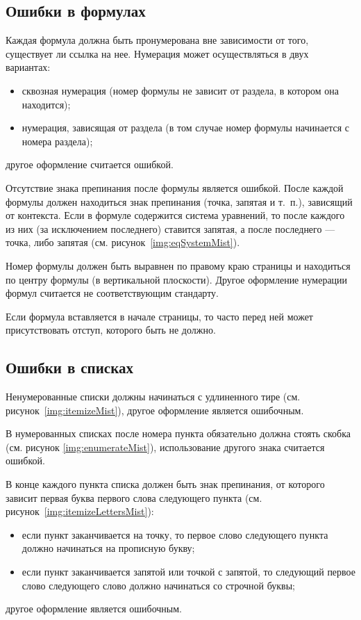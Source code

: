 \begin{appendices}
	\subsection{Ошибки в формулах}
	Каждая формула должна быть пронумерована вне зависимости от того, существует ли ссылка на нее. Нумерация может осуществляться в двух вариантах:
	\begin{itemize}
		\item сквозная нумерация (номер формулы не зависит от раздела, в котором она находится);
		\item нумерация, зависящая от раздела (в том случае номер формулы начинается с номера раздела);
	\end{itemize}
	другое оформление считается ошибкой.
	
	Отсутствие знака препинания после формулы является ошибкой. После каждой формулы должен находиться знак препинания (точка, запятая и т.~п.), зависящий от контекста. Если в формуле содержится система уравнений, то после каждого из них (за исключением последнего) ставится запятая, а после последнего --- точка, либо запятая (см. рисунок~\ref{img:eqSystemMist}).
	
	Номер формулы должен быть выравнен по правому краю страницы и находиться по центру формулы (в вертикальной плоскости). Другое оформление нумерации формул считается не соответствующим стандарту.
	
	Если формула вставляется в начале страницы, то часто перед ней может присутствовать отступ, которого быть не должно.
	
	\subsection{Ошибки в списках}
	Ненумерованные списки должны начинаться с удлиненного тире (см. рисунок~\ref{img:itemizeMist}), другое оформление является ошибочным.
	
	В нумерованных списках после номера пункта обязательно должна стоять скобка (см. рисунок \ref{img:enumerateMist}), использование другого знака считается ошибкой.
	
	В конце каждого пункта списка должен быть знак препинания, от которого зависит первая буква первого слова следующего пункта (см. рисунок~\ref{img:itemizeLettersMist}):
	\begin{itemize}
		\item если пункт заканчивается на точку, то первое слово следующего пункта должно начинаться на прописную букву;
		\item если пункт заканчивается запятой или точкой с запятой, то следующий первое слово следующего слово должно начинаться со строчной буквы;
	\end{itemize}
	другое оформление является ошибочным.
	

\end{appendices}
